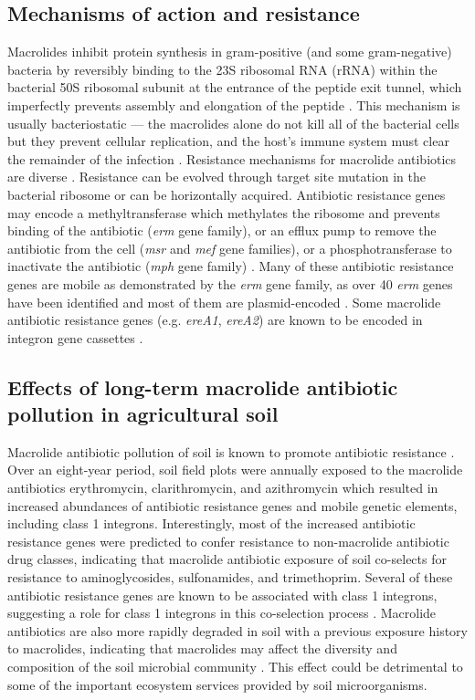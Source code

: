 \subsection{Mechanisms of action and resistance}

Macrolides inhibit protein synthesis in gram-positive (and some gram-negative) bacteria by reversibly binding to the 23S ribosomal RNA (rRNA) within the bacterial 50S ribosomal subunit at the entrance of the peptide exit tunnel, which imperfectly prevents assembly and elongation of the peptide \parencite{Lohsen.2019, Fyfe.2016}.
This mechanism is usually bacteriostatic --- the macrolides alone do not kill all of the bacterial cells but they prevent cellular replication, and the host’s immune system must clear the remainder of the infection \parencite{Pankey.2004}.
Resistance mechanisms for macrolide antibiotics are diverse \parencite{Fyfe.2016}.
Resistance can be evolved through target site mutation in the bacterial ribosome or can be horizontally acquired.
Antibiotic resistance genes may encode a methyltransferase which methylates the ribosome and prevents binding of the antibiotic (\textit{erm} gene family), or an efflux pump to remove the antibiotic from the cell (\textit{msr} and \textit{mef} gene families), or a phosphotransferase to inactivate the antibiotic (\textit{mph} gene family) \parencite{Fyfe.2016}.
Many of these antibiotic resistance genes are mobile as demonstrated by the \textit{erm} gene family, as over 40 \textit{erm} genes have been identified and most of them are plasmid-encoded \parencite{Alcock.2020, Leclercq.2002}.
Some macrolide antibiotic resistance genes (e.g. \textit{ereA1}, \textit{ereA2}) are known to be encoded in integron gene cassettes \parencite{Partridge.2009}.

\subsection{Effects of long-term macrolide antibiotic pollution in agricultural soil}

Macrolide antibiotic pollution of soil is known to promote antibiotic resistance \parencite{Lau.2020}.
Over an eight-year period, soil field plots were annually exposed to the macrolide antibiotics erythromycin, clarithromycin, and azithromycin which resulted in increased abundances of antibiotic resistance genes and mobile genetic elements, including class 1 integrons.
Interestingly, most of the increased antibiotic resistance genes were predicted to confer resistance to non-macrolide antibiotic drug classes, indicating that macrolide antibiotic exposure of soil co-selects for resistance to aminoglycosides, sulfonamides, and trimethoprim.
Several of these antibiotic resistance genes are known to be associated with class 1 integrons, suggesting a role for class 1 integrons in this co-selection process \parencite{Lau.2020}.
Macrolide antibiotics are also more rapidly degraded in soil with a previous exposure history to macrolides, indicating that macrolides may affect the diversity and composition of the soil microbial community \parencite{Topp.2016}.
This effect could be detrimental to some of the important ecosystem services provided by soil microorganisms.

